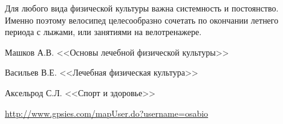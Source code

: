 \documentclass[a4paper,14pt]{extreport}
\begin{document}
Для любого вида физической культуры важна системность и постоянство. Именно поэтому велосипед целесообразно сочетать по окончании летнего периода с лыжами, или занятиями на велотренажере.

\begin{thebibliography}{99}

 Машков А.В. <<Основы лечебной физической культуры>>

 Васильев В.Е. <<Лечебная физическая культура>>

 Аксельрод С.Л.  <<Спорт и здоровье>>

 \href{http://www.gpsies.com/mapUser.do?username=osabio}{http://www.gpsies.com/mapUser.do?username=osabio}

\end{thebibliography}
\end{document}
